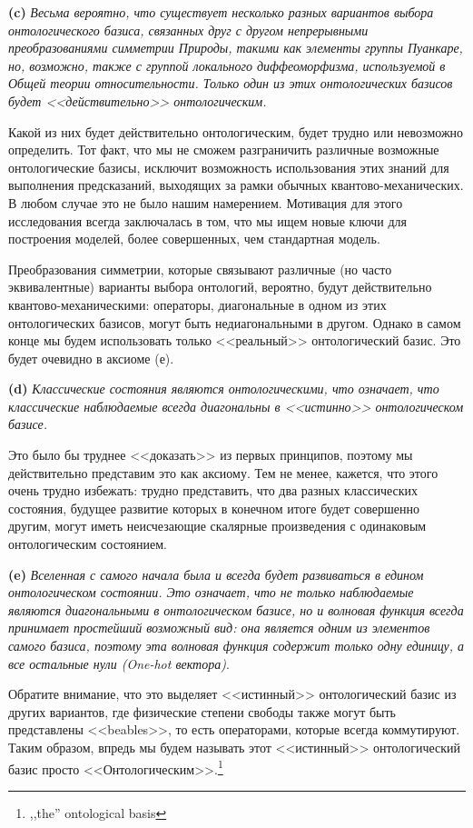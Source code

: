 \documentclass[main.tex]{subfiles}
\begin{document}
\textbf{(c)} {\it Весьма вероятно, что существует несколько разных вариантов выбора онтологического базиса, связанных друг с другом непрерывными преобразованиями симметрии Природы, такими как элементы группы Пуанкаре, но, возможно, также с группой локального диффеоморфизма, используемой в Общей теории относительности. Только один из этих онтологических базисов будет <<действительно>> онтологическим.}

Какой из них будет действительно онтологическим, будет трудно или невозможно определить. Тот факт, что мы не сможем разграничить различные возможные онтологические базисы, исключит возможность использования этих знаний для выполнения предсказаний, выходящих за рамки обычных квантово-механических. В любом случае это не было нашим намерением. Мотивация для этого исследования всегда заключалась в том, что мы ищем новые ключи для построения моделей, более совершенных, чем стандартная модель.

Преобразования симметрии, которые связывают различные (но часто эквивалентные) варианты выбора онтологий, вероятно, будут действительно квантово-механическими: операторы, диагональные в одном из этих онтологических базисов, могут быть недиагональными в другом. Однако в самом конце мы будем использовать только <<реальный>> онтологический базис. Это будет очевидно в аксиоме (е).

\textbf{(d)} {\it Классические состояния являются онтологическими, что означает, что классические наблюдаемые всегда диагональны в <<истинно>> онтологическом базисе. }
          
Это было бы труднее <<доказать>> из первых принципов, поэтому мы действительно представим это как аксиому. Тем не менее, кажется, что этого очень трудно избежать: трудно представить, что два разных классических состояния, будущее развитие которых в конечном итоге будет совершенно другим, могут иметь неисчезающие скалярные произведения с одинаковым онтологическим состоянием.

\textbf{(e)} {\it Вселенная с самого начала была и всегда будет развиваться в едином онтологическом состоянии. Это означает, что не только наблюдаемые являются диагональными в онтологическом базисе, но и волновая функция всегда принимает простейший возможный вид: она является одним из элементов самого базиса, поэтому эта волновая функция содержит только одну единицу, а все остальные нули (\textit{One-hot вектора})}.

Обратите внимание, что это выделяет <<истинный>> онтологический базис из других вариантов, где физические степени свободы также могут быть представлены <<beables>>, то есть операторами, которые всегда коммутируют. Таким образом, впредь мы будем называть этот <<истинный>> онтологический базис просто <<Онтологическим>>.\footnote{,,the'' ontological basis}
\end{document}
